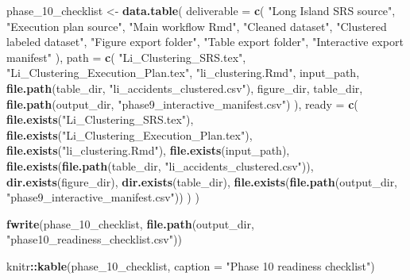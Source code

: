 \documentclass[
]{article}
\newenvironment{Shaded}{\begin{snugshade}}{\end{snugshade}}
\newcommand{\AttributeTok}[1]{\textcolor[rgb]{0.13,0.29,0.53}{#1}}
\newcommand{\FunctionTok}[1]{\textcolor[rgb]{0.13,0.29,0.53}{\textbf{#1}}}
\newcommand{\NormalTok}[1]{#1}
\newcommand{\OtherTok}[1]{\textcolor[rgb]{0.56,0.35,0.01}{#1}}
\newcommand{\SpecialCharTok}[1]{\textcolor[rgb]{0.81,0.36,0.00}{\textbf{#1}}}
\newcommand{\StringTok}[1]{\textcolor[rgb]{0.31,0.60,0.02}{#1}}
\begin{document}
\begin{Shaded}
\begin{Highlighting}[]
\NormalTok{phase\_10\_checklist }\OtherTok{\textless{}{-}} \FunctionTok{data.table}\NormalTok{(}
  \AttributeTok{deliverable =} \FunctionTok{c}\NormalTok{(}
    \StringTok{"Long Island SRS source"}\NormalTok{,}
    \StringTok{"Execution plan source"}\NormalTok{,}
    \StringTok{"Main workflow Rmd"}\NormalTok{,}
    \StringTok{"Cleaned dataset"}\NormalTok{,}
    \StringTok{"Clustered labeled dataset"}\NormalTok{,}
    \StringTok{"Figure export folder"}\NormalTok{,}
    \StringTok{"Table export folder"}\NormalTok{,}
    \StringTok{"Interactive export manifest"}
\NormalTok{  ),}
  \AttributeTok{path =} \FunctionTok{c}\NormalTok{(}
    \StringTok{"Li\_Clustering\_SRS.tex"}\NormalTok{,}
    \StringTok{"Li\_Clustering\_Execution\_Plan.tex"}\NormalTok{,}
    \StringTok{"li\_clustering.Rmd"}\NormalTok{,}
\NormalTok{    input\_path,}
    \FunctionTok{file.path}\NormalTok{(table\_dir, }\StringTok{"li\_accidents\_clustered.csv"}\NormalTok{),}
\NormalTok{    figure\_dir,}
\NormalTok{    table\_dir,}
    \FunctionTok{file.path}\NormalTok{(output\_dir, }\StringTok{"phase9\_interactive\_manifest.csv"}\NormalTok{)}
\NormalTok{  ),}
  \AttributeTok{ready =} \FunctionTok{c}\NormalTok{(}
    \FunctionTok{file.exists}\NormalTok{(}\StringTok{"Li\_Clustering\_SRS.tex"}\NormalTok{),}
    \FunctionTok{file.exists}\NormalTok{(}\StringTok{"Li\_Clustering\_Execution\_Plan.tex"}\NormalTok{),}
    \FunctionTok{file.exists}\NormalTok{(}\StringTok{"li\_clustering.Rmd"}\NormalTok{),}
    \FunctionTok{file.exists}\NormalTok{(input\_path),}
    \FunctionTok{file.exists}\NormalTok{(}\FunctionTok{file.path}\NormalTok{(table\_dir, }\StringTok{"li\_accidents\_clustered.csv"}\NormalTok{)),}
    \FunctionTok{dir.exists}\NormalTok{(figure\_dir),}
    \FunctionTok{dir.exists}\NormalTok{(table\_dir),}
    \FunctionTok{file.exists}\NormalTok{(}\FunctionTok{file.path}\NormalTok{(output\_dir, }\StringTok{"phase9\_interactive\_manifest.csv"}\NormalTok{))}
\NormalTok{  )}
\NormalTok{)}

\FunctionTok{fwrite}\NormalTok{(phase\_10\_checklist, }\FunctionTok{file.path}\NormalTok{(output\_dir, }\StringTok{"phase10\_readiness\_checklist.csv"}\NormalTok{))}

\NormalTok{knitr}\SpecialCharTok{::}\FunctionTok{kable}\NormalTok{(phase\_10\_checklist, }\AttributeTok{caption =} \StringTok{"Phase 10 readiness checklist"}\NormalTok{)}
\end{Highlighting}
\end{Shaded}
\end{document}

